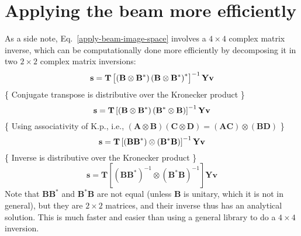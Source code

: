 \documentclass[a4paper,11pt]{article}
\begin{document}
\section{Applying the beam more efficiently}
As a side note, Eq.~\eqref{apply-beam-image-space} involves a $4\times 4$ complex matrix inverse, which can be computationally done more efficiently by decomposing it in two $2\times 2$ complex matrix inversions:
\begin{equation} \notag
 \textbf{s} =
\mathbf{T} \left[ \left(\mathbf{B} \otimes \mathbf{B}^* \right) \left(\mathbf{B} \otimes \mathbf{B}^* \right)^*\right]^{-1} \mathbf{Y} \textbf{v}
\end{equation}
\{ Conjugate transpose is distributive over the Kronecker product  \}
\begin{equation} \notag
 \textbf{s} =
\mathbf{T} \left[ \left(\mathbf{B} \otimes \mathbf{B}^* \right) \left(\mathbf{B}^* \otimes \mathbf{B} \right)\right]^{-1} \mathbf{Y} \textbf{v}
\end{equation}
\{ Using associativity of K.p., i.e., $\left(\mathbf{A} \otimes \mathbf{B} \right) \left(\mathbf{C} \otimes \mathbf{D} \right) = (\mathbf{AC}) \otimes (\mathbf{BD})$ \}
\begin{equation} \notag
 \textbf{s} = \mathbf{T} \left[ (\mathbf{BB}^*) \otimes (\mathbf{B}^*\mathbf{B}) \right]^{-1} \mathbf{Y} \textbf{v}
\end{equation}
\{ Inverse is distributive over the Kronecker product \}
\begin{equation}
 \textbf{s} = \mathbf{T} \left[ (\mathbf{BB}^*)^{-1} \otimes (\mathbf{B}^*\mathbf{B})^{-1} \right] \mathbf{Y} \textbf{v}
\end{equation}
Note that $\mathbf{BB}^*$ and $\mathbf{B}^*\mathbf{B}$ are not equal (unless $\mathbf{B}$ is unitary, which it is not in general), but they are $2\times 2$ matrices, and their inverse thus has an analytical solution. This is much faster and easier than using a general library to do a $4 \times 4$ inversion.
\label{lastpage}
\end{document}
